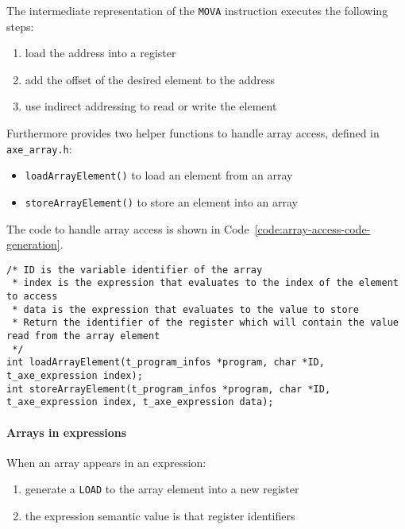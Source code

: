 \documentclass[english]{article}
\begin{document}
The intermediate representation of the \texttt{MOVA} instruction executes the following steps:

\begin{enumerate}
  \item load the address into a register
  \item add the offset of the desired element to the address
  \item use indirect addressing to read or write the element
\end{enumerate}

Furthermore \acse provides two helper functions to handle array access, defined in \texttt{axe\_array.h}:

\begin{itemize}[label=\textbf{\texttt{>}}]
  \item \texttt{loadArrayElement()} to load an element from an array
  \item \texttt{storeArrayElement()} to store an element into an array
\end{itemize}

The code to handle array access is shown in Code~\ref{code:array-access-code-generation}.

\begin{onepage}
  \begin{lstlisting}[language=LANCE, caption={Array access code generation}, label={code:array-access-code-generation}]
/* ID is the variable identifier of the array
 * index is the expression that evaluates to the index of the element to access
 * data is the expression that evaluates to the value to store
 * Return the identifier of the register which will contain the value read from the array element
 */
int loadArrayElement(t_program_infos *program, char *ID, t_axe_expression index);
int storeArrayElement(t_program_infos *program, char *ID, t_axe_expression index, t_axe_expression data);
\end{lstlisting}
\end{onepage}

\paragraph{Arrays in expressions}

When an array appears in an expression:

\begin{enumerate}
  \item generate a \texttt{LOAD} to the array element into a new register
  \item the expression semantic value is that register identifiers
\end{enumerate}
\end{document}
